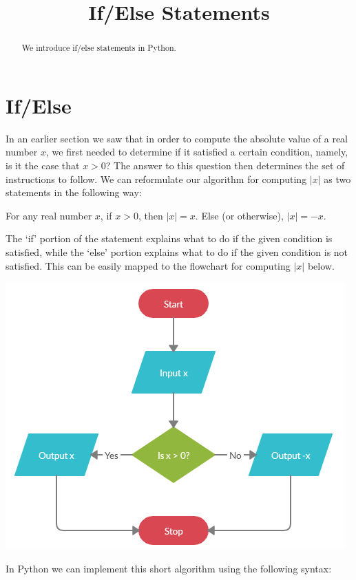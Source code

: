 \documentclass{ximera}
\title{If/Else Statements}
\begin{document}
  
\lstset{language=Python,frame=single}
\begin{abstract}  
We introduce if/else statements in Python.
\end{abstract}  
\maketitle

\section{If/Else}

In an earlier section we saw that in order to compute the absolute value of a real number $x$, we first needed to determine if it satisfied a certain condition, namely, is it the case that $x>0$? The answer to this question then determines the set of instructions to follow. We can reformulate our algorithm for computing $|x|$ as two statements in the following way:

For any real number $x$, if $x>0$, then $|x|=x$. Else (or otherwise), $|x|=-x$.

The `if' portion of the statement explains what to do if the given condition is satisfied, while the `else' portion explains what to do if the given condition is not satisfied. This can be easily mapped to the flowchart for computing $|x|$ below.

\begin{center}
	\includegraphics{absalgo.png}
\end{center}

In Python we can implement this short algorithm using the following syntax:
\end{document}
